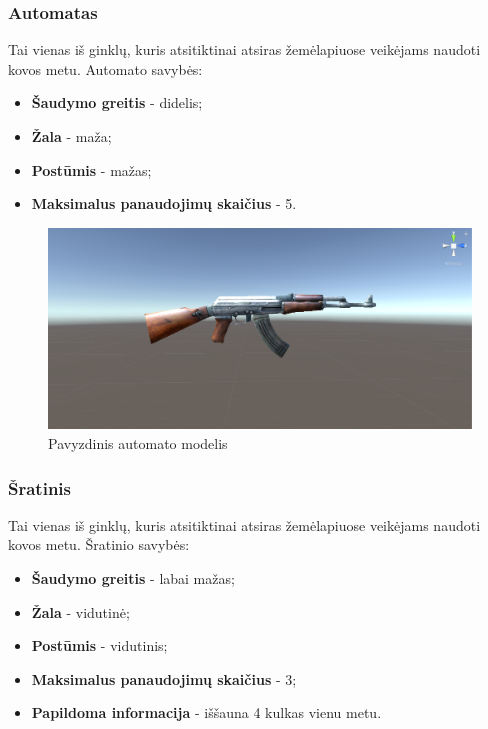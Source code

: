 \documentclass{VUMIFPSkursinis}
\begin{document}
\subsubsection{Automatas}
Tai vienas iš ginklų, kuris atsitiktinai atsiras žemėlapiuose veikėjams naudoti kovos metu. Automato savybės:
\begin{itemize}
    \item \textbf{Šaudymo greitis} - didelis;
    \item \textbf{Žala} - maža;
    \item \textbf{Postūmis} - mažas;
    \item \textbf{Maksimalus panaudojimų skaičius} - 5.
\end{itemize}

\begin{figure}[H]
    \centering
    \includegraphics[scale=0.3]{img/Weapons/Rifle.png}
    \caption{Pavyzdinis automato modelis}
    \label{img:rifle}
\end{figure}

\subsubsection{Šratinis}
Tai vienas iš ginklų, kuris atsitiktinai atsiras žemėlapiuose veikėjams naudoti kovos metu. Šratinio savybės:
\begin{itemize}
    \item \textbf{Šaudymo greitis} - labai mažas;
    \item \textbf{Žala} - vidutinė;
    \item \textbf{Postūmis} - vidutinis;
    \item \textbf{Maksimalus panaudojimų skaičius} - 3;
    \item \textbf{Papildoma informacija} - iššauna 4 kulkas vienu metu.
\end{itemize}
\end{document}
